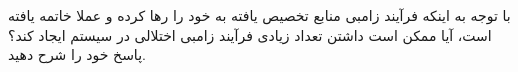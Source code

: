 \question[10] با توجه به اینکه فرآیند زامبی منابع تخصیص یافته به خود را رها کرده
و عملا خاتمه یافته است، آیا ممکن است داشتن تعداد زیادی فرآیند زامبی اختلالی در سیستم ایجاد کند؟ پاسخ خود را شرح دهید.
